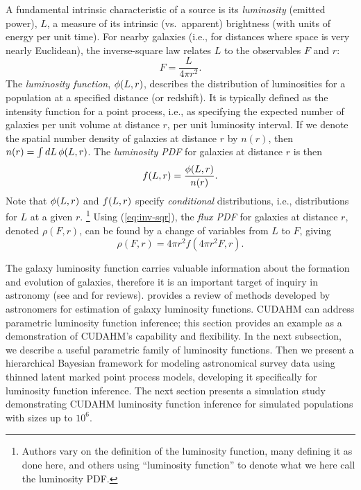 A fundamental intrinsic characteristic of a source is its \emph{luminosity} (emitted power), $L$, a measure of its intrinsic (vs.\ apparent) brightness (with units of energy per unit time).
For nearby galaxies (i.e., for distances where space is very nearly Euclidean), the inverse-square law relates $L$ to the observables $F$ and $r$:
\begin{equation}
F=\frac{L}{4\pi r^2}.
\label{eq:inv-sqr}
\end{equation}
The \emph{luminosity function}, $\phi(L, r)$, describes the distribution of luminosities for a population at a specified distance (or redshift).
It is typically defined as the intensity function for a point process, i.e., as specifying the expected number of galaxies per unit volume at distance $r$, per unit luminosity interval.
If we denote the spatial number density of galaxies at distance $r$ by $n(r)$, then $n(r) = \int dL\, \phi(L, r)$.
The \emph{luminosity PDF} for galaxies at distance $r$ is then
\begin{equation}
f(L,r) = \frac{\phi(L, r)}{n(r)}.
\label{eq:lpdf}
\end{equation}
Note that $\phi(L,r)$ and $f(L,r)$ specify \emph{conditional} distributions, i.e., distributions for $L$ at a given $r$.%
\footnote{Authors vary on the definition of the luminosity function, many defining it as done here, and others using ``luminosity function'' to denote what we here call the luminosity PDF.}
Using (\ref{eq:inv-sqr}), the \emph{flux PDF} for galaxies at distance $r$, denoted $\rho(F,r)$, can be found by a change of variables from $L$ to $F$, giving
\begin{equation}\label{eq:fluxPDF}
\rho(F,r) = 4\pi r^2 f(4\pi r^2 F, r).
\end{equation}

The galaxy luminosity function carries valuable information about the formation and evolution of galaxies, therefore it is an important target of inquiry in astronomy (see \citealt{BST88-LumFuncReview} and \citealt{J11-LumFuncReview} for reviews).
\citealt{J11-LumFuncReview} provides a review of methods developed by astronomers for estimation of galaxy luminosity functions.
CUDAHM can address parametric luminosity function inference; this section provides an example as a demonstration of CUDAHM's capability and flexibility.
In the next subsection, we describe a useful parametric family of luminosity functions.
Then we present a hierarchical Bayesian framework for modeling astronomical survey data using thinned latent marked point process models, developing it specifically for luminosity function inference.
The next section presents a simulation study demonstrating CUDAHM luminosity function inference for simulated populations with sizes up to $10^6$.

